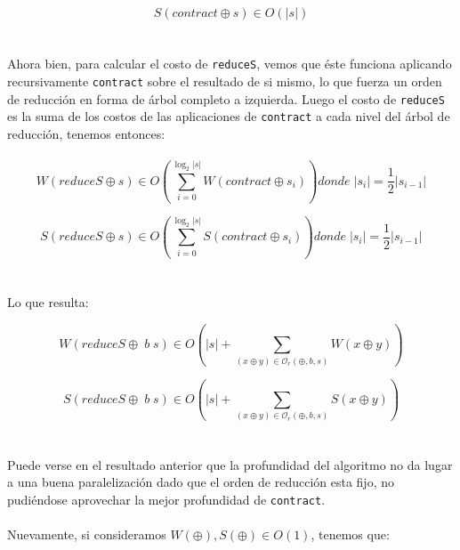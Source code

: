 \documentclass[a4paper,10pt]{article}
\begin{document}
		\begin{equation*}
			S \left( contract \oplus s \right) \in O \left( \vert s \vert \right)
		\end{equation*}
\\
\\	
		Ahora bien, para calcular el costo de \texttt{reduceS}, vemos que éste funciona aplicando recursivamente \texttt{contract} sobre el resultado de si mismo, lo que fuerza un orden de reducción en forma de árbol completo a izquierda. Luego el costo de \texttt{reduceS} es la suma de los costos de las aplicaciones de \texttt{contract} a cada nivel del árbol de reducción, tenemos entonces:
\\
\\	
	\begin{equation*}
		W \left( reduceS \oplus s \right) \in O \left(\sum_{i=0}^{\log_2 \vert s \vert} W \left( contract \oplus s_i \right) \right) donde \; \vert s_i\vert = \frac{1}{2} \vert s_{i-1} \vert
	\end{equation*}

	\begin{equation*}
		S \left( reduceS \oplus s \right) \in O \left(\sum_{i=0}^{\log_2 \vert s \vert} S \left( contract \oplus s_i \right) \right) donde \; \vert s_i\vert = \frac{1}{2} \vert s_{i-1} \vert
	\end{equation*}
\\
\\	
	Lo que resulta:
	
	\begin{equation*}
    W \left( reduceS \oplus \; b \; s \right) \in
    O \left( \vert s \vert + \sum_{(x \oplus y) \in \mathcal{O}_r(\oplus,b,s)} W \left( x \oplus y \right) \right)
	\end{equation*}

	\begin{equation*}
    S \left( reduceS \oplus \; b \; s \right) \in
    O \left( \vert s \vert + \sum_{(x \oplus y) \in \mathcal{O}_r(\oplus,b,s)} S \left( x \oplus y \right) \right)
	\end{equation*}
\\
\\
		Puede verse en el resultado anterior que la profundidad del algoritmo no da lugar a una buena paralelización dado que el orden de reducción esta fijo, no pudiéndose aprovechar la mejor profundidad de \texttt{contract}.
\\
\\
				Nuevamente, si consideramos $W(\oplus), S(\oplus) \in O(1)$, tenemos que:
		
\end{document}
